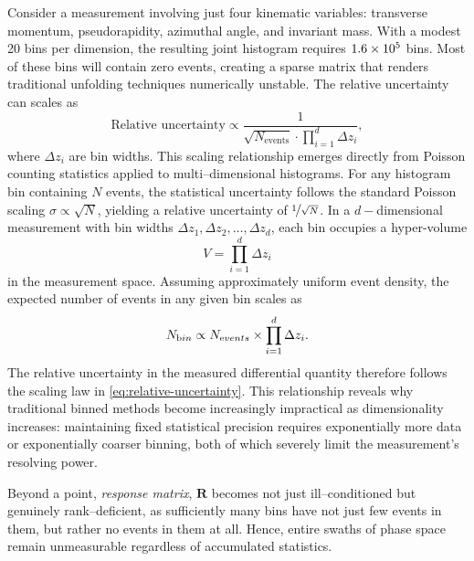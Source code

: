             Consider a measurement involving just four kinematic variables: transverse momentum, pseudorapidity, azimuthal angle, and invariant mass.
            With a modest 20 bins per dimension, the resulting joint histogram requires \(\num{1.6d5}\) bins. Most of these bins will contain zero events, creating a sparse matrix that renders traditional unfolding techniques numerically unstable.
            The relative uncertainty can scales as
            \begin{equation}
            \label{eq:relative-uncertainty}
                \text{Relative uncertainty} \propto \frac{1}{\sqrt{N_{\text{events}}} \cdot \prod_{i=1}^d \Delta z_i},
            \end{equation}
            where \(\Delta z_i\) are bin widths.
            This scaling relationship emerges directly from Poisson counting statistics applied to multi--dimensional histograms.
            For any histogram bin containing \(N\) events, the statistical uncertainty follows the standard Poisson scaling \(\sigma\propto\sqrt{N}\), yielding a relative uncertainty of \(\nicefrac{1}{\sqrt{N}}\).
            In a \(d-\)dimensional measurement with bin widths \(\Delta z_1, \Delta z_2, \dots, \Delta z_d\), each bin occupies a hyper-volume
            \[
                V = \prod_{i=1}^d\Delta z_i
            \]
            in the measurement space.
            Assuming approximately uniform event density, the expected number of events in any given bin scales as
            \[
                N_{\text bin} \propto N_{\text events} \times \prod_{i=1}^d\Delta z_i.
            \]
            The relative uncertainty in the measured differential quantity therefore follows the scaling law in \cref{eq:relative-uncertainty}.
            This relationship reveals why traditional binned methods become increasingly impractical as dimensionality increases: maintaining fixed statistical precision requires exponentially more data or exponentially coarser binning, both of which severely limit the measurement's resolving power.
            
            Beyond a point, \textit{response matrix}, \(\mathbf{R}\) becomes not just ill--conditioned but genuinely rank--deficient, as sufficiently many bins have not just few events in them, but rather no events in them at all.
            Hence, entire swaths of phase space remain unmeasurable regardless of accumulated statistics.
    
